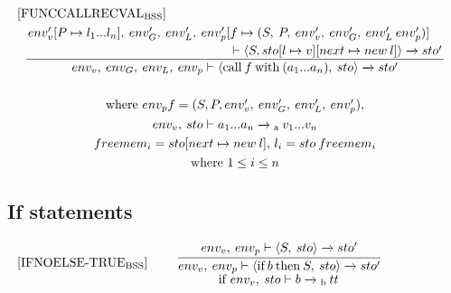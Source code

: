 \begin{equation} \label{app:FUNCCALLRECVALRAP}
\centering
\begin{split}
\begin{minipage}{\linewidth}
$[\text{FUNCCALLRECVAL}_\text{BSS}]$
\end{minipage}
\\
\begin{minipage}{\linewidth}
\centering
$
\dfrac
    {
    \splitdfrac
        {
            env'_v[P \mapsto l_1...l_n], \: env'_G, \: env'_L, \: env'_p[f \mapsto (S, \: P, \: env'_v, \: env'_G, \: env'_L \: env'_p)]
        }
        { 
            \vdash \langle S, sto[l \mapsto v][next \mapsto new \: l] \rangle \xrightarrow{} sto'
        }
    }
    {
        env_v, \: env_G, \: env_L, \: env_p \vdash \langle \text{call} \: f \: \text{with} \: (a_1...a_n), \: sto \rangle \xrightarrow{} sto'
    }
$
\end{minipage}
\\\\
\begin{minipage}{\linewidth}
\centering
where $env_p f = (S, P, env'_v, \: env_G', \: env'_L, \: env'_p),$
\end{minipage}
\\
\begin{minipage}{\linewidth}
\centering
$env_v, \: sto \vdash a_1...a_n \xrightarrow{}\textsubscript{a} \: v_1...v_n$
\end{minipage}
\\
\begin{minipage}{\linewidth}
\centering
$freemem_i = sto[next \mapsto new \: l]$, $l_i = sto \: freemem_i$
\end{minipage}
\\
\begin{minipage}{\linewidth}
\centering
where $1 \leq i \leq n $
\end{minipage}
\end{split}
\end{equation}



\subsection*{If statements}
\begin{equation}
\begin{minipage}{.2\linewidth}
$[\text{IFNOELSE-TRUE}_\text{BSS}]$
\end{minipage}
\begin{minipage}{.8\linewidth}
\centering
$\cfrac{env_v, \: env_p \vdash \langle S, \: sto\rangle \xrightarrow{} sto'}{env_v, \: env_p \vdash \langle \text{if} \: b \: \text{then} \: S, \: sto \rangle \xrightarrow{} sto'}$ 
\\
if $env_v, \: sto \vdash b \xrightarrow{}\textsubscript{b} \: tt$
\end{minipage}
\end{equation}


